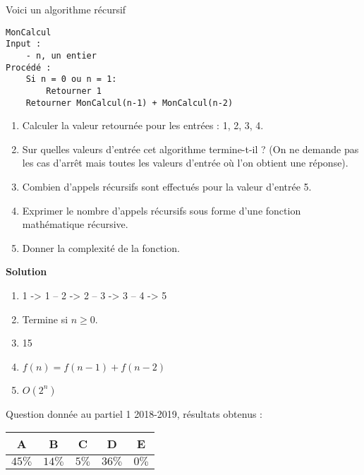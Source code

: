 
\begin{exercice}[Partiel 2018-2019]
Voici un algorithme récursif

\begin{lstlisting}
MonCalcul
Input :
    - n, un entier
Procédé :
    Si n = 0 ou n = 1:
        Retourner 1
    Retourner MonCalcul(n-1) + MonCalcul(n-2)
\end{lstlisting}

\begin{enumerate}
\item Calculer la valeur retournée pour les entrées : 1, 2, 3, 4.
\item Sur quelles valeurs d'entrée cet algorithme termine-t-il ? (On ne demande pas les cas d'arrêt mais toutes les valeurs d'entrée où l'on obtient une réponse).
\item Combien d'appels récursifs sont effectués pour la valeur d'entrée 5.
\item Exprimer le nombre d'appels récursifs sous forme d'une fonction mathématique récursive.
\item Donner la complexité de la fonction.
\end{enumerate}

\textbf{Solution}

\begin{enumerate}
\item 1 -> 1 -- 2 -> 2 -- 3 -> 3 -- 4 -> 5
\item Termine si $n \geq 0$.
\item 15
\item $f(n) = f(n-1) + f(n-2)$
\item $O(2^n)$
\end{enumerate}

Question donnée au partiel 1 2018-2019, résultats obtenus :

\vspace{0.5cm}

\begin{tabular}{|c|c|c|c|c|}
\hline
A & B & C & D & E \\ \hline
$45\%$ & $14\%$ & $5\%$ & $36\%$ & $0\%$ \\ \hline
\end{tabular} 

\end{exercice}